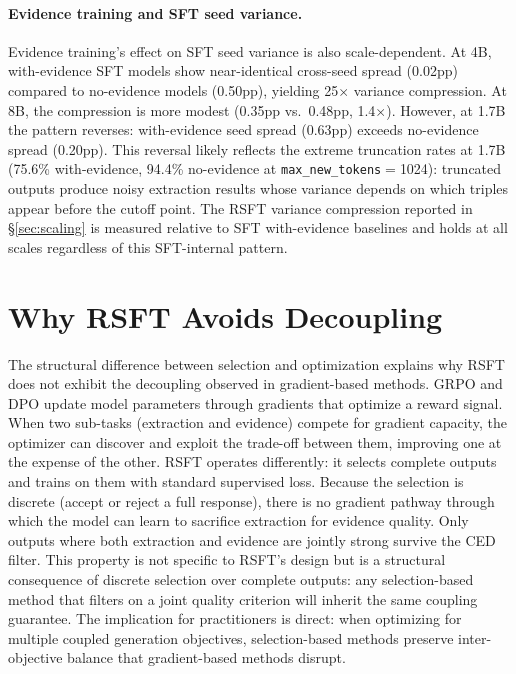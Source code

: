 \paragraph{Evidence training and SFT seed variance.}
Evidence training's effect on SFT seed variance is also scale-dependent. At 4B, with-evidence SFT models show near-identical cross-seed spread (0.02pp) compared to no-evidence models (0.50pp), yielding 25$\times$ variance compression. At 8B, the compression is more modest (0.35pp vs.\ 0.48pp, 1.4$\times$). However, at 1.7B the pattern reverses: with-evidence seed spread (0.63pp) exceeds no-evidence spread (0.20pp). This reversal likely reflects the extreme truncation rates at 1.7B (75.6\% with-evidence, 94.4\% no-evidence at \texttt{max\_new\_tokens}$=$1024): truncated outputs produce noisy extraction results whose variance depends on which triples appear before the cutoff point. The RSFT variance compression reported in \S\ref{sec:scaling} is measured relative to SFT with-evidence baselines and holds at all scales regardless of this SFT-internal pattern.


\section{Why RSFT Avoids Decoupling}
\label{sec:rsft_theory}

The structural difference between selection and optimization explains why RSFT does not exhibit the decoupling observed in gradient-based methods. GRPO and DPO update model parameters through gradients that optimize a reward signal. When two sub-tasks (extraction and evidence) compete for gradient capacity, the optimizer can discover and exploit the trade-off between them, improving one at the expense of the other. RSFT operates differently: it selects complete outputs and trains on them with standard supervised loss. Because the selection is discrete (accept or reject a full response), there is no gradient pathway through which the model can learn to sacrifice extraction for evidence quality. Only outputs where both extraction and evidence are jointly strong survive the CED filter. This property is not specific to RSFT's design but is a structural consequence of discrete selection over complete outputs: any selection-based method that filters on a joint quality criterion will inherit the same coupling guarantee. The implication for practitioners is direct: when optimizing for multiple coupled generation objectives, selection-based methods preserve inter-objective balance that gradient-based methods disrupt.


